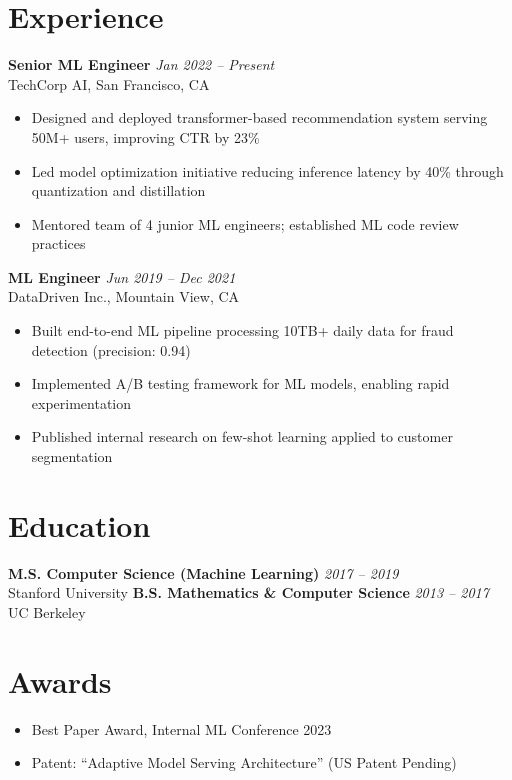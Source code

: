\documentclass[11pt,a4paper]{article}
\newcommand{\entry}[4]{\noindent\textbf{#1} \hfill \textit{#2}\\#3 \hfill #4\vspace{0.4em}}
\begin{document}
\section{Experience}
\entry{Senior ML Engineer}{Jan 2022 -- Present}{TechCorp AI, San Francisco, CA}{}
\begin{itemize}[leftmargin=1.5em,nosep,label={\color{accent}\textbullet}]
\item Designed and deployed transformer-based recommendation system serving 50M+ users, improving CTR by 23\%
\item Led model optimization initiative reducing inference latency by 40\% through quantization and distillation
\item Mentored team of 4 junior ML engineers; established ML code review practices
\end{itemize}
\vspace{0.3em}

\entry{ML Engineer}{Jun 2019 -- Dec 2021}{DataDriven Inc., Mountain View, CA}{}
\begin{itemize}[leftmargin=1.5em,nosep,label={\color{accent}\textbullet}]
\item Built end-to-end ML pipeline processing 10TB+ daily data for fraud detection (precision: 0.94)
\item Implemented A/B testing framework for ML models, enabling rapid experimentation
\item Published internal research on few-shot learning applied to customer segmentation
\end{itemize}

\section{Education}
\entry{M.S. Computer Science (Machine Learning)}{2017 -- 2019}{Stanford University}{}
\entry{B.S. Mathematics \& Computer Science}{2013 -- 2017}{UC Berkeley}{}

\section{Awards}
\begin{itemize}[leftmargin=1.5em,nosep,label={\color{accent}\textbullet}]
\item Best Paper Award, Internal ML Conference 2023
\item Patent: ``Adaptive Model Serving Architecture'' (US Patent Pending)
\end{itemize}
\end{document}
